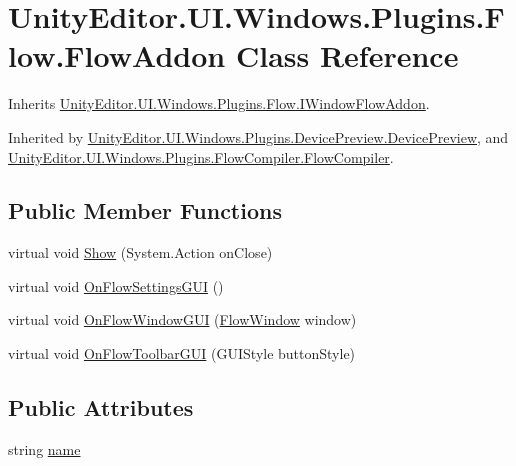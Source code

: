 \hypertarget{class_unity_editor_1_1_u_i_1_1_windows_1_1_plugins_1_1_flow_1_1_flow_addon}{}\section{Unity\+Editor.\+U\+I.\+Windows.\+Plugins.\+Flow.\+Flow\+Addon Class Reference}
\label{class_unity_editor_1_1_u_i_1_1_windows_1_1_plugins_1_1_flow_1_1_flow_addon}


Inherits \hyperlink{interface_unity_editor_1_1_u_i_1_1_windows_1_1_plugins_1_1_flow_1_1_i_window_flow_addon}{Unity\+Editor.\+U\+I.\+Windows.\+Plugins.\+Flow.\+I\+Window\+Flow\+Addon}.



Inherited by \hyperlink{class_unity_editor_1_1_u_i_1_1_windows_1_1_plugins_1_1_device_preview_1_1_device_preview}{Unity\+Editor.\+U\+I.\+Windows.\+Plugins.\+Device\+Preview.\+Device\+Preview}, and \hyperlink{class_unity_editor_1_1_u_i_1_1_windows_1_1_plugins_1_1_flow_compiler_1_1_flow_compiler}{Unity\+Editor.\+U\+I.\+Windows.\+Plugins.\+Flow\+Compiler.\+Flow\+Compiler}.

\subsection*{Public Member Functions}
\begin{DoxyCompactItemize}
\item 
virtual void \hyperlink{class_unity_editor_1_1_u_i_1_1_windows_1_1_plugins_1_1_flow_1_1_flow_addon_aebacd992030dad733086ba347b4f588d}{Show} (System.\+Action on\+Close)
\item 
virtual void \hyperlink{class_unity_editor_1_1_u_i_1_1_windows_1_1_plugins_1_1_flow_1_1_flow_addon_ac9b74b4f59bdbf403c548d51d97ebf8e}{On\+Flow\+Settings\+G\+U\+I} ()
\item 
virtual void \hyperlink{class_unity_editor_1_1_u_i_1_1_windows_1_1_plugins_1_1_flow_1_1_flow_addon_a206fa65da95d69094c8bf0a76679414b}{On\+Flow\+Window\+G\+U\+I} (\hyperlink{class_unity_engine_1_1_u_i_1_1_windows_1_1_plugins_1_1_flow_1_1_flow_window}{Flow\+Window} window)
\item 
virtual void \hyperlink{class_unity_editor_1_1_u_i_1_1_windows_1_1_plugins_1_1_flow_1_1_flow_addon_a6b29ecc4a74b5c9967143cfd020d9b35}{On\+Flow\+Toolbar\+G\+U\+I} (G\+U\+I\+Style button\+Style)
\end{DoxyCompactItemize}
\subsection*{Public Attributes}
\begin{DoxyCompactItemize}
\item 
string \hyperlink{class_unity_editor_1_1_u_i_1_1_windows_1_1_plugins_1_1_flow_1_1_flow_addon_ac982c5f7283d9dc684dd254dea14342f}{name}
\end{DoxyCompactItemize}


